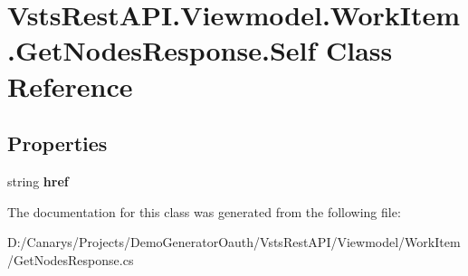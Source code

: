 \hypertarget{class_vsts_rest_a_p_i_1_1_viewmodel_1_1_work_item_1_1_get_nodes_response_1_1_self}{}\section{Vsts\+Rest\+A\+P\+I.\+Viewmodel.\+Work\+Item.\+Get\+Nodes\+Response.\+Self Class Reference}
\label{class_vsts_rest_a_p_i_1_1_viewmodel_1_1_work_item_1_1_get_nodes_response_1_1_self}
\subsection*{Properties}
\begin{DoxyCompactItemize}
\item 
\mbox{\label{class_vsts_rest_a_p_i_1_1_viewmodel_1_1_work_item_1_1_get_nodes_response_1_1_self_a70c146e805a9ef37f4a4364410a1ed77}} 
string {\bfseries href}
\end{DoxyCompactItemize}


The documentation for this class was generated from the following file\+:\begin{DoxyCompactItemize}
\item 
D\+:/\+Canarys/\+Projects/\+Demo\+Generator\+Oauth/\+Vsts\+Rest\+A\+P\+I/\+Viewmodel/\+Work\+Item/Get\+Nodes\+Response.\+cs\end{DoxyCompactItemize}
